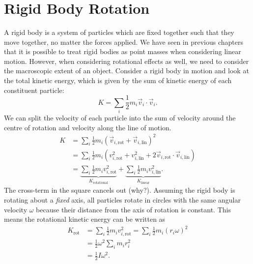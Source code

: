 \documentclass[../classical_mechanics.tex]{subfiles}
\begin{document}
    \section{Rigid Body Rotation}\label{sec:rigid-body-rotation}
        \paragraph{}
        A rigid body is a system of particles which are fixed together such that they move together, no matter the forces applied.
        We have seen in previous chapters that it is possible to treat rigid bodies as point masses when considering linear motion.
        However, when considering rotational effects as well, we need to consider the macroscopic extent of an object.
        Consider a rigid body in motion and look at the total kinetic energy, which is given by the sum of kinetic energy of each constituent particle:
        \begin{equation}
            K=\sum_i\frac{1}{2}m_i\vec{v}_i\cdot\vec{v}_i.
        \end{equation}
        We can split the velocity of each particle into the sum of velocity around the centre of rotation and velocity along the line of motion.
        \begin{align}
            K&=\sum_i\frac{1}{2}m_i(\vec{v}_{i,\text{rot}}+\vec{v}_{i,\text{lin}})^2\\
            &=\sum_i\frac{1}{2}m_i(v_{i,\text{rot}}^2+v_{i,\text{lin}}^2+2\vec{v}_{i,\text{rot}}\cdot\vec{v}_{i,\text{lin}})\\
            &=\underbrace{\sum_i\frac{1}{2}m_iv_{i,\text{rot}}^2}_{K_\text{rotational}}+\underbrace{\sum_i\frac{1}{2}m_iv_{i,\text{lin}}^2}_{K_\text{linear}}.
        \end{align}
        The cross-term in the square cancels out (why?).
        Assuming the rigid body is rotating about a \textit{fixed} axis, all particles rotate in circles with the same angular velocity $\omega$ because their distance from the axis of rotation is constant.
        This means the rotational kinetic energy can be written as
        \begin{align}
            K_\text{rot}&=\sum_i\frac{1}{2}m_iv_{i,\text{rot}}^2=\sum_i\frac{1}{2}m_i(r_i\omega)^2\\
            &=\frac{1}{2}\omega^2\sum_i m_ir_i^2\\
            &=\frac{1}{2}I\omega^2.
        \end{align}
\end{document}
